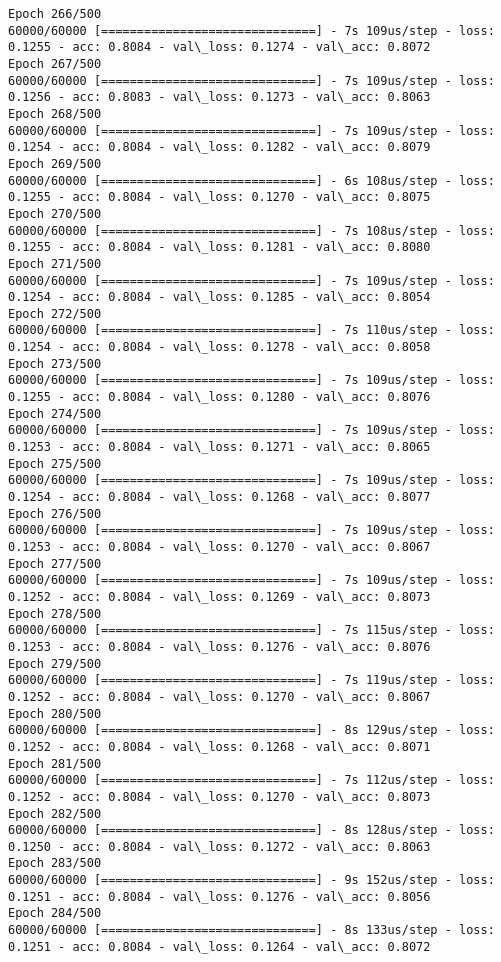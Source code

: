 \documentclass[11pt]{article}
\begin{document}
\begin{Verbatim}[commandchars=\\\{\}]
Epoch 266/500
60000/60000 [==============================] - 7s 109us/step - loss: 0.1255 - acc: 0.8084 - val\_loss: 0.1274 - val\_acc: 0.8072
Epoch 267/500
60000/60000 [==============================] - 7s 109us/step - loss: 0.1256 - acc: 0.8083 - val\_loss: 0.1273 - val\_acc: 0.8063
Epoch 268/500
60000/60000 [==============================] - 7s 109us/step - loss: 0.1254 - acc: 0.8084 - val\_loss: 0.1282 - val\_acc: 0.8079
Epoch 269/500
60000/60000 [==============================] - 6s 108us/step - loss: 0.1255 - acc: 0.8084 - val\_loss: 0.1270 - val\_acc: 0.8075
Epoch 270/500
60000/60000 [==============================] - 7s 108us/step - loss: 0.1255 - acc: 0.8084 - val\_loss: 0.1281 - val\_acc: 0.8080
Epoch 271/500
60000/60000 [==============================] - 7s 109us/step - loss: 0.1254 - acc: 0.8084 - val\_loss: 0.1285 - val\_acc: 0.8054
Epoch 272/500
60000/60000 [==============================] - 7s 110us/step - loss: 0.1254 - acc: 0.8084 - val\_loss: 0.1278 - val\_acc: 0.8058
Epoch 273/500
60000/60000 [==============================] - 7s 109us/step - loss: 0.1255 - acc: 0.8084 - val\_loss: 0.1280 - val\_acc: 0.8076
Epoch 274/500
60000/60000 [==============================] - 7s 109us/step - loss: 0.1253 - acc: 0.8084 - val\_loss: 0.1271 - val\_acc: 0.8065
Epoch 275/500
60000/60000 [==============================] - 7s 109us/step - loss: 0.1254 - acc: 0.8084 - val\_loss: 0.1268 - val\_acc: 0.8077
Epoch 276/500
60000/60000 [==============================] - 7s 109us/step - loss: 0.1253 - acc: 0.8084 - val\_loss: 0.1270 - val\_acc: 0.8067
Epoch 277/500
60000/60000 [==============================] - 7s 109us/step - loss: 0.1252 - acc: 0.8084 - val\_loss: 0.1269 - val\_acc: 0.8073
Epoch 278/500
60000/60000 [==============================] - 7s 115us/step - loss: 0.1253 - acc: 0.8084 - val\_loss: 0.1276 - val\_acc: 0.8076
Epoch 279/500
60000/60000 [==============================] - 7s 119us/step - loss: 0.1252 - acc: 0.8084 - val\_loss: 0.1270 - val\_acc: 0.8067
Epoch 280/500
60000/60000 [==============================] - 8s 129us/step - loss: 0.1252 - acc: 0.8084 - val\_loss: 0.1268 - val\_acc: 0.8071
Epoch 281/500
60000/60000 [==============================] - 7s 112us/step - loss: 0.1252 - acc: 0.8084 - val\_loss: 0.1270 - val\_acc: 0.8073
Epoch 282/500
60000/60000 [==============================] - 8s 128us/step - loss: 0.1250 - acc: 0.8084 - val\_loss: 0.1272 - val\_acc: 0.8063
Epoch 283/500
60000/60000 [==============================] - 9s 152us/step - loss: 0.1251 - acc: 0.8084 - val\_loss: 0.1276 - val\_acc: 0.8056
Epoch 284/500
60000/60000 [==============================] - 8s 133us/step - loss: 0.1251 - acc: 0.8084 - val\_loss: 0.1264 - val\_acc: 0.8072

\end{Verbatim}
\end{document}
